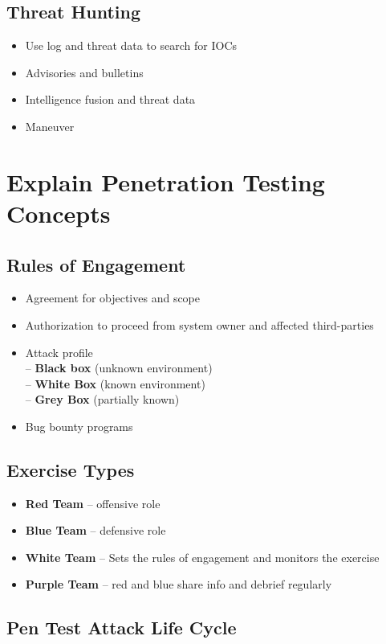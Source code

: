 	\subsection {Threat Hunting}
		\begin{itemize}
			\item Use log and threat data to search for IOCs
			\item Advisories and bulletins
			\item Intelligence fusion and threat data
			\item Maneuver
		\end{itemize}

\section {Explain Penetration Testing Concepts}
	\subsection {Rules of Engagement}
		\begin{itemize}
			\item Agreement for objectives and scope
			\item Authorization to proceed from system owner and affected third-parties
			\item Attack profile \\
				-- \textbf{Black box} (unknown environment) \\
				-- \textbf{White Box} (known environment) \\
				-- \textbf{Grey Box} (partially known)
			\item Bug bounty programs
		\end{itemize}
	\subsection {Exercise Types}
		\begin{itemize}
			\item \textbf{Red Team} -- offensive role
			\item \textbf{Blue Team} -- defensive role
			\item \textbf{White Team} -- Sets the rules of engagement and monitors
				the exercise
			\item \textbf{Purple Team} -- red and blue share info and debrief regularly
		\end{itemize}
	\subsection {Pen Test Attack Life Cycle}
